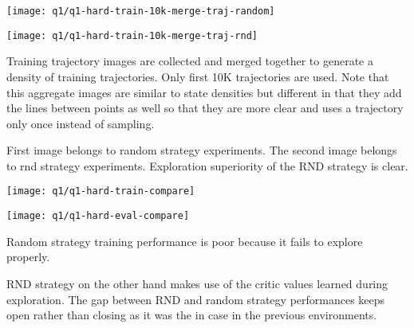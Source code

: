 \documentclass[11pt]{article}
\begin{document}
    \hspace*{-0.6in}
    \texttt{[image: q1/q1-hard-train-10k-merge-traj-random]}

    \hspace*{-0.6in}
    \texttt{[image: q1/q1-hard-train-10k-merge-traj-rnd]}

    Training trajectory images are collected and merged together to generate a density of training trajectories.
    Only first 10K trajectories are used.
    Note that this aggregate images are similar to state densities but different in that they add the lines between points as well so that they are more clear and uses a trajectory only once instead of sampling.

    First image belongs to random strategy experiments.
    The second image belongs to rnd strategy experiments.
    Exploration superiority of the RND strategy is clear.

    \hspace*{-0.6in}
    \texttt{[image: q1/q1-hard-train-compare]}

    \hspace*{-0.6in}
    \texttt{[image: q1/q1-hard-eval-compare]}

    Random strategy training performance is poor because it fails to explore properly.

    RND strategy on the other hand makes use of the critic values learned during exploration.
    The gap between RND and random strategy performances keeps open rather than closing as it was the in case in the previous environments.
\end{document}
